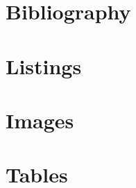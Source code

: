 \documentclass{article}
\begin{document}
\maketitle

\newpage
\tableofcontents

\newpage


























\nocite{*}

\newpage
\section{Bibliography}
\printbibliography

\newpage
\section{Listings}
\renewcommand{\lstlistlistingname}{}
\lstlistoflistings

\newpage
\section{Images}
\renewcommand{\listfigurename}{}
\listoffigures

\newpage
\section{Tables}
\renewcommand{\listtablename}{}
\listoftables
\end{document}
